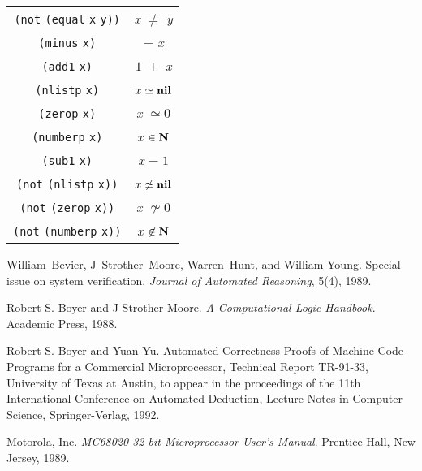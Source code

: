 \begin{tabular}{|c|c|}
{\tt{(}}{\tt{not}} {\tt{(}}{\tt{equal}} {\tt{x}} {\tt{y}}{\tt{)}}{\tt{)}}&{\it{x\/}} $\not=$ {\it{y\/}} \\  
{\tt{(}}{\tt{minus}} {\tt{x}}{\tt{)}}&$-$ {\it{x\/}} \\  
{\tt{(}}{\tt{add1}} {\tt{x}}{\tt{)}}&$1\;+$ {\it{x\/}} \\  
{\tt{(}}{\tt{nlistp}} {\tt{x}}{\tt{)}}&{\it{x\/}} $\simeq {\rm{\bf{nil}}}$ \\  
{\tt{(}}{\tt{zerop}} {\tt{x}}{\tt{)}}&{\it{x\/}} $\simeq 0$ \\  
{\tt{(}}{\tt{numberp}} {\tt{x}}{\tt{)}}&{\it{x\/}} $\in {\rm\bf{N}}$ \\  
{\tt{(}}{\tt{sub1}} {\tt{x}}{\tt{)}}&{\it{x\/}} $-\;1$ \\  
{\tt{(}}{\tt{not}} {\tt{(}}{\tt{nlistp}} {\tt{x}}{\tt{)}}{\tt{)}}&{\it{x\/}} $\not\simeq {\rm{\bf{nil}}}$ \\  
{\tt{(}}{\tt{not}} {\tt{(}}{\tt{zerop}} {\tt{x}}{\tt{)}}{\tt{)}}&{\it{x\/}} $\not\simeq 0$ \\  
{\tt{(}}{\tt{not}} {\tt{(}}{\tt{numberp}} {\tt{x}}{\tt{)}}{\tt{)}}&{\it{x\/}} $\not\in {\rm\bf{N}}$ \\  
  \hline \end{tabular}

\newpage

\begin{thebibliography}{99}

 William~Bevier, J~Strother~Moore, Warren~Hunt, and William
Young.  Special issue on system verification.  {\em Journal of Automated
Reasoning}, 5(4), 1989.

 Robert S. Boyer and J Strother Moore. {\em A Computational
Logic Handbook}. Academic Press, 1988.

 Robert S. Boyer and Yuan Yu.  Automated Correctness
Proofs of Machine Code Programs for a Commercial Microprocessor, Technical
Report TR-91-33, University of Texas at Austin, to appear in the proceedings of
the 11th International Conference on Automated Deduction, Lecture Notes in
Computer Science, Springer-Verlag, 1992.

 Motorola, Inc.  {\em MC68020 32-bit Microprocessor User's
Manual}.  Prentice Hall, New Jersey, 1989.

\end{thebibliography}

\newpage
{}


\printindex

